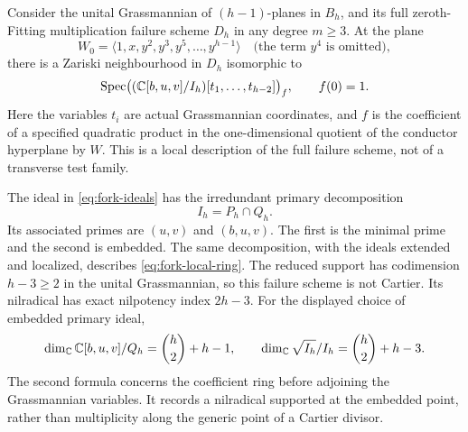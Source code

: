 \begin{theorem}
\label{thm:embedded-multigenerator}
Consider the unital Grassmannian of $(h-1)$-planes in $B_h$, and
its full zeroth-Fitting multiplication failure scheme $D_h$ in
any degree $m\ge3$. At the plane
\begin{equation}\label{eq:fork-plane}
 W_0=\langle1,x,y^2,y^3,y^5,\ldots,y^{h-1}\rangle
 \quad\text{(the term $y^4$ is omitted)},
\end{equation}
there is a Zariski neighbourhood in $D_h$ isomorphic to
\begin{equation}\label{eq:fork-local-ring}
 \operatorname{Spec}\bigl((\mathbb C[b,u,v]/I_h)
                [t_1,\ldots,t_{h-2}]\bigr)_f,
 \qquad f(0)=1.
\end{equation}
Here the variables $t_i$ are actual Grassmannian coordinates, and
$f$ is the coefficient of a specified quadratic product in the
one-dimensional quotient of the conductor hyperplane by $W$.
This is a local description of the full failure scheme, not of a
transverse test family.

The ideal in \eqref{eq:fork-ideals} has the irredundant primary
 decomposition
\begin{equation}\label{eq:fork-primary}
 I_h=P_h\cap Q_h.
\end{equation}
Its associated primes are $(u,v)$ and $(b,u,v)$. The first is the
minimal prime and the second is embedded. The same decomposition,
with the ideals extended and localized, describes
\eqref{eq:fork-local-ring}. The reduced support has codimension
$h-3\ge2$ in the unital Grassmannian, so this failure scheme is not
Cartier. Its nilradical has exact nilpotency index $2h-3$.
For the displayed choice of embedded primary ideal,
\begin{equation}\label{eq:fork-lengths}
 \dim_\mathbb C\mathbb C[b,u,v]/Q_h=\binom h2+h-1,
 \qquad
 \dim_\mathbb C\sqrt{I_h}/I_h=\binom h2+h-3.
\end{equation}
The second formula concerns the coefficient ring before adjoining
the Grassmannian variables. It records a nilradical supported at
the embedded point, rather than multiplicity along the generic
point of a Cartier divisor.
\end{theorem}
